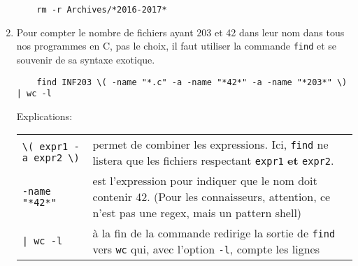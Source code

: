 \documentclass[10pt]{article}
\begin{document}
\begin{enumerate}
  \lstset{style=none}
  \begin{lstlisting}
    rm -r Archives/*2016-2017*
  \end{lstlisting}

\item Pour compter le nombre de fichiers ayant 203 et 42 dans leur nom
  dans tous nos programmes en C, pas le choix, il faut utiliser la
  commande \texttt{find} et se souvenir de sa syntaxe exotique.

  \lstset{style=none}
  \begin{lstlisting}
    find INF203 \( -name "*.c" -a -name "*42*" -a -name "*203*" \) | wc -l
  \end{lstlisting}

  \vspace{0.5cm}
  Explications:
  \vspace{0.2cm}

  \begin{tabular}{l p{10cm}}
    \verb|\( expr1 -a expr2 \)| & permet de combiner les
                                  expressions. Ici, \texttt{find} ne listera
                                  que les fichiers respectant
                                  \texttt{expr1} \textbf{et}
                                  \texttt{expr2}. \vspace{0.2cm} \\
    \verb|-name "*42*"|         & est l'expression pour indiquer que le nom doit
                                  contenir 42. (Pour les connaisseurs,
                                  attention, ce n'est pas une
                                  regex, mais un pattern shell) \vspace{0.2cm} \\
    \verb#| wc -l#              & à la fin de la commande redirige la sortie de
                                  \texttt{find} vers \texttt{wc} qui, avec l'option
                                  \texttt{-l}, compte les lignes \\
  \end{tabular}

\end{enumerate}

%
%
%
\end{document}
